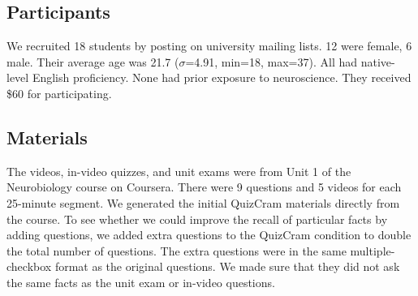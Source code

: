 \documentclass{chi-ext}
\begin{document}


\subsection{Participants}

We recruited 18  students by posting on university mailing lists. 12 were female, 6 male. Their average age was 21.7 ($\sigma$=4.91, min=18, max=37). All had native-level English proficiency. None had prior exposure to neuroscience.  They received \$60 for participating. %

\subsection{Materials}



The videos, in-video quizzes, and unit exams were from Unit 1 of the Neurobiology course on Coursera. There were 9 questions and 5 videos for each 25-minute segment. We generated the initial QuizCram materials directly from the course. To see whether we could improve the recall of particular facts by adding questions, we added extra questions to the QuizCram condition to double the total number of questions. The extra questions were in the same multiple-checkbox format as the original questions. We made sure that they did not ask the same facts as the unit exam or in-video questions.
\end{document}
